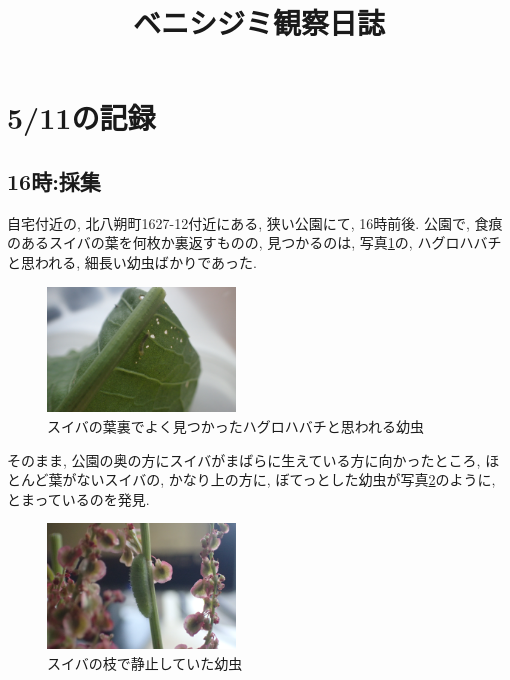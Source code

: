 \documentclass{jsarticle}
\title{ベニシジミ観察日誌}
\begin{document}
\maketitle

\section{5/11の記録}

\subsection{16時:採集}
自宅付近の, 北八朔町1627-12付近にある, 狭い公園にて, 16時前後. 
公園で, 食痕のあるスイバの葉を何枚か裏返すものの, 見つかるのは, 写真\ref{pic-hagurohabachi}の, ハグロハバチと思われる, 細長い幼虫ばかりであった. 
\begin{figure}[htbp]
  \begin{center}
    \includegraphics[width=5cm]{photo/hagurohabachi1.JPG}
    \caption{スイバの葉裏でよく見つかったハグロハバチと思われる幼虫}
    \label{pic-hagurohabachi}
  \end{center}
\end{figure}

そのまま, 公園の奥の方にスイバがまばらに生えている方に向かったところ, ほとんど葉がないスイバの, かなり上の方に, ぼてっとした幼虫が写真\ref{pic-sitting-on-branch}のように, とまっているのを発見. 
\begin{figure}[htbp]
  \begin{center}
    \includegraphics[width=5cm]{photo/sitting_on_branch.JPG}
    \caption{スイバの枝で静止していた幼虫}
    \label{pic-sitting-on-branch}
  \end{center}
\end{figure}
\end{document}

